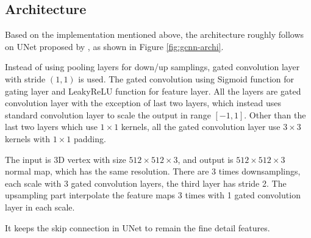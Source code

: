 \documentclass[border=15pt, multi, tikz]{article}
\begin{document}

\subsection{Architecture}
\label{sec:architecture}
Based on the implementation mentioned above, the architecture roughly follows on UNet proposed by \cite{unet}, as shown in Figure \ref{fig:gcnn-archi}. 

Instead of using pooling layers for down/up samplings, gated convolution layer with stride $ (1,1) $ is used. The gated convolution using Sigmoid function for gating layer and LeakyReLU function for feature layer. All the layers are gated convolution layer with the exception of last two layers, which instead uses standard convolution layer to scale the output in range $\left[-1, 1\right]$. Other than the last two layers which use $ 1\times 1 $ kernels, all the gated convolution layer use $ 3\times 3 $ kernels with $ 1\times1 $ padding. 

The input is 3D vertex with size $ 512\times512\times3 $, and output is $ 512\times512\times3 $ normal map, which has the same resolution. There are 3 times downsamplings, each scale with 3 gated convolution layers, the third layer has stride 2. The upsampling part interpolate the feature maps 3 times with 1 gated convolution layer in each scale. 

It keeps the skip connection in UNet to remain the fine detail features. 
\end{document}
